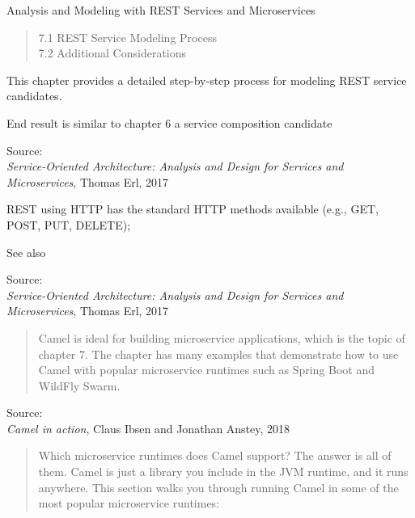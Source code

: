 \documentclass[Screen16to9,17pt]{foils}
\begin{document}
Analysis and Modeling with REST
Services and Microservices

\begin{quote}
7.1 REST Service Modeling Process\\
7.2 Additional Considerations
\end{quote}

\begin{list2}
\item This chapter provides a detailed step-by-step process for modeling REST service
candidates.
\item End result is similar to chapter 6 a service composition candidate
\end{list2}

Source: {\footnotesize\\
\emph{Service‑Oriented Architecture: Analysis and Design for Services and Microservices}, Thomas Erl, 2017}




\begin{list2}
\item REST using HTTP has the standard HTTP methods available (e.g., GET, POST, PUT, DELETE);
\item See also 
\end{list2}
Source: {\footnotesize\\
\emph{Service‑Oriented Architecture: Analysis and Design for Services and Microservices}, Thomas Erl, 2017}




\begin{quote}
Camel is ideal for building microservice applications, which is the topic of
chapter 7. The chapter has many examples that demonstrate how to use Camel
with popular microservice runtimes such as Spring Boot and WildFly Swarm.
\end{quote}

Source: {\footnotesize\\
\emph{Camel in action}, Claus Ibsen and Jonathan Anstey, 2018}




\begin{quote}
  Which microservice runtimes does Camel support? The answer is all of them. Camel is
  just a library you include in the JVM runtime, and it runs anywhere. This section walks
  you through running Camel in some of the most popular microservice runtimes:
\end{quote}
\end{document}
